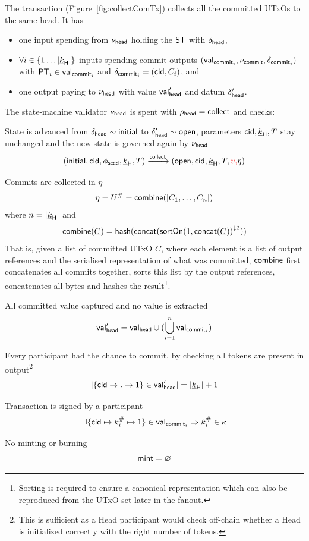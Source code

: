 \noindent The \mtxCCom{} transaction (Figure~\ref{fig:collectComTx}) collects
all the committed UTxOs to the same head. It has
\begin{itemize}
	\item one input spending from $\nu_\mathsf{head}$ holding the $\mathsf{ST}$ with $\delta_{\mathsf{head}}$,
	\item $\forall i \in \{1 \dots |\underline{k}_{\mathsf{H}}|\}$ inputs spending commit outputs
	      $(\mathsf{val}_{\mathsf{commit}_{i}}, \nu_{\mathsf{commit}}, \delta_{\mathsf{commit}_{i}})$ with $\mathsf{PT}_{i} \in \mathsf{val}_{\mathsf{commit}_{i}}$
	      and $\delta_{\mathsf{commit}_{i}} = (\mathsf{cid}, C_{i})$, and
	\item one output paying to $\nu_\mathsf{head}$ with value $\mathsf{val}_{\mathsf{head}}'$ and
	      datum $\delta_{\mathsf{head}}'$.
\end{itemize}

\noindent The state-machine validator $\nu_\mathsf{head}$ is spent with
$\rho_{\mathsf{head}} = \mathsf{collect}$ and checks:
\begin{menumerate}
	\item State is advanced from $\delta_{\mathsf{head}} \sim \mathsf{initial}$ to
	$\delta_{\mathsf{head}}' \sim \mathsf{open}$, parameters $\mathsf{cid},\underline{k}_{\mathsf{H}},T$ stay
	unchanged and the new state is governed again by $\nu_\mathsf{head}$
	\[
		(\mathsf{initial},\mathsf{cid},\phi_{\mathsf{seed}},\underline{k}_{\mathsf{H}},T) \xrightarrow{\mathsf{collect}} (\mathsf{open},\mathsf{cid},\underline{k}_{\mathsf{H}},T,\textcolor{red}{v,}\eta)
	\]
	\item Commits are collected in $\eta$
	\[
		\eta = U^{\#} = \mathsf{combine}([C_{1}, \dots, C_{n}])
	\]
	where $n = |\underline{k}_{\mathsf{H}}|$ and
	\[
		\mathsf{combine}(\underline{C}) = \mathsf{hash}(\mathsf{concat}({\mathsf{sortOn}(1, \mathsf{concat}(\underline{C}))}^{\downarrow2}))
	\]
	That is, given a list of committed UTxO $\underline{C}$, where each element is
	a list of output references and the serialised representation of what was
	committed, $\mathsf{combine}$ first concatenates all commits together, sorts this list
	by the output references, concatenates all bytes and hashes the
	result\footnote{Sorting is required to ensure a canonical representation which
		can also be reproduced from the UTxO set later in the fanout.}.

	\item All committed value captured and no value is extracted
	\[
		\mathsf{val}_{\mathsf{head}}' = \mathsf{val}_{\mathsf{head}} \cup (\bigcup_{i=1}^{n} \mathsf{val}_{\mathsf{commit}_{i}})
	\]
	\item Every participant had the chance to commit, by checking all tokens are
	present in output\footnote{This is sufficient as a Head participant would
		check off-chain whether a Head is initialized correctly with the right
		number of tokens.}
	\[
		|\{\mathsf{cid} \rightarrow . \rightarrow 1\} \in \mathsf{val}_{\mathsf{head}}'| = |\underline{k}_{\mathsf{H}}| + 1
	\]
	\item Transaction is signed by a participant
	\[
		\exists \{\mathsf{cid} \mapsto k^{\#}_{i} \mapsto 1\} \in \mathsf{val}_{\mathsf{commit}_{i}} \Rightarrow k^{\#}_{i} \in \kappa
	\]
	\item No minting or burning
	\[
		\mathsf{mint} = \varnothing
	\]
\end{menumerate}


